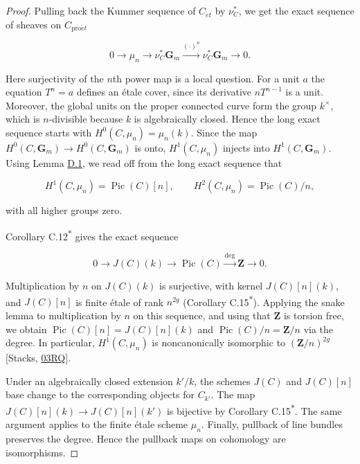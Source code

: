 \documentclass[11pt]{article}
\newcommand{\bpout}[1]{#1\textsuperscript{\hyperlink{bp-outside}{\ensuremath{\ast}}}}
\begin{document}
\begin{proof}[{Proof}]\label{bp9}%
Pulling back the Kummer sequence of \(C_{\acute{e}t}\) by \(\nu_C^*\), we get the exact sequence of sheaves on \(C_{\mathrm{pro}\acute{e}t}\)

\[
0\longrightarrow\mu_n\longrightarrow\nu_C^*\mathbf G_m
\xrightarrow{(\cdot)^n}\nu_C^*\mathbf G_m
\longrightarrow0.
\]

Here surjectivity of the \(n\)th power map is a local question. For a unit \(a\) the equation \(T^n=a\) defines an étale cover, since its derivative \(nT^{n-1}\) is a unit. Moreover, the global units on the proper connected curve form the group \(k^\times\), which is \(n\)-divisible because \(k\) is algebraically closed. Hence the long exact sequence starts with \(H^0(C,\mu_n)=\mu_n(k)\). Since the map \(H^0(C,\mathbf G_m)\to H^0(C,\mathbf G_m)\) is onto, \(H^1(C,\mu_n)\) injects into \(H^1(C,\mathbf G_m)\). Using Lemma \hyperref[bp5]{D.1}, we read off from the long exact sequence that

\[
H^1(C,\mu_n)=\operatorname{Pic}(C)[n],\qquad
H^2(C,\mu_n)=\operatorname{Pic}(C)/n,
\]

with all higher groups zero.

Corollary \bpout{C.12} gives the exact sequence

\[
0\longrightarrow J(C)(k)\longrightarrow\operatorname{Pic}(C)
\xrightarrow{\deg}\mathbf Z\longrightarrow0.
\]

Multiplication by \(n\) on \(J(C)(k)\) is surjective, with kernel \(J(C)[n](k)\), and \(J(C)[n]\) is finite étale of rank \(n^{2g}\) (Corollary \bpout{C.15}).  Applying the snake lemma to multiplication by \(n\) on this sequence, and using that \(\mathbf Z\) is torsion free, we obtain \(\operatorname{Pic}(C)[n]=J(C)[n](k)\) and \(\operatorname{Pic}(C)/n=\mathbf Z/n\) via the degree. In particular, \(H^1(C,\mu_n)\) is noncanonically isomorphic to \((\mathbf Z/n)^{2g}\) [Stacks, \href{https://stacks.math.columbia.edu/tag/03RQ}{03RQ}].

Under an algebraically closed extension \(k'/k\), the schemes \(J(C)\) and \(J(C)[n]\) base change to the corresponding objects for \(C_{k'}\). The map \(J(C)[n](k)\to J(C)[n](k')\) is bijective by Corollary \bpout{C.15}. The same argument applies to the finite étale scheme \(\mu_n\). Finally, pullback of line bundles preserves the degree. Hence the pullback maps on cohomology are isomorphisms.
\end{proof}
\end{document}
